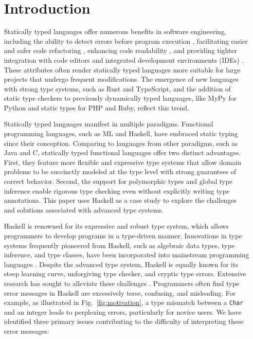 \documentclass[pdflatex,lineno,sn-nature,Numbered]{sn-jnl}%
\begin{document}
\section{Introduction} \label{sec:introduction}

Statically typed languages offer numerous benefits in software engineering, including the ability to detect errors before program execution \cite{Ray2017-gq,Gao2017-xn}, facilitating easier and safer code refactoring \cite{Kleinschmager2012-bg}, enhancing code readability \cite{Endrikat2014-uz}, and providing tighter integration with code editors and integrated development environments (IDEs) \cite{Mayer2012-ko}. These attributes often render statically typed languages more suitable for large projects that undergo frequent modifications. The emergence of new languages with strong type systems, such as Rust and TypeScript, and the addition of static type checkers to previously dynamically typed languages, like MyPy for Python and static types for PHP and Ruby, reflect this trend.

Statically typed languages manifest in multiple paradigms. Functional programming languages, such as ML and Haskell, have embraced static typing since their conception. Comparing to languages from other paradigms, such as Java and C, statically typed functional languages offer two distinct advantages. First, they feature more flexible and expressive type systems that allow domain problems to be succinctly modeled at the type level with strong guarantees of correct behavior. Second, the support for polymorphic types and global type inference enable rigorous type checking even without explicitly writing type annotations. This paper uses Haskell as a case study to explore the challenges and solutions associated with advanced type systems.

Haskell is renowned for its expressive and robust type system, which allows programmers to develop programs in a type-driven manner. Innovations in type systems frequently pioneered from Haskell, such as algebraic data types, type inference, and type classes, have been incorporated into mainstream programming languages \cite{Hudak2007-kn, TypeScriptTeam_undated-qk, Klabnik_undated-mp, Griesemer_undated-ff}. Despite the advanced type system, Haskell is equally known for its steep learning curve, unforgiving type checker, and cryptic type errors. Extensive research has sought to alleviate these challenges \cite{Tirronen2015-nr, Chen2014-dz, Heeren2003-kd, Zhang2015-xy, Lerner2007-mu, Zhang2017-tj}. Programmers often find type error messages in Haskell are excessively terse, confusing, and misleading. For example, as illustrated in Fig.~\ref{fig:motivation}, a type mismatch between a {\tt Char} and an integer leads to perplexing errors, particularly for novice users. We have identified three primary issues contributing to the difficulty of interpreting these error messages:
\end{document}

